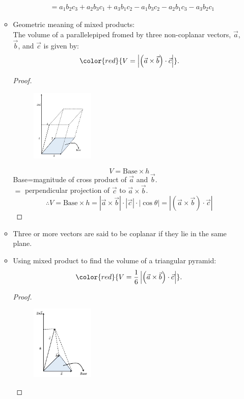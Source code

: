 \documentclass[12pt, a4paper]{article}
\newtheorem{proof}{Proof}[subsection]
\begin{document}
\begin{enumerate}
\begin{itemize}
$$\begin{aligned}
      &=a_1b_2c_3+a_2b_3c_1+a_3b_1c_2-a_1b_3c_2-a_2b_1c_3-a_3b_2c_1
    \end{aligned}$$
    \item Geometric meaning of mixed products: \\
    The volume of a parallelepiped fromed by three non-coplanar vectors, $\vec{a}$, $\vec{b}$, and $\vec{c}$ is given by: 
    $${\color{red}{V=\left|\left(\vec{a}\times\vec{b}\right)\cdot\vec{c}\right|}}.$$
    \begin{proof}
      \begin{figure}[H]
        \centering
        \includegraphics[width=0.3\textwidth]{Fig.3.10.jpg}
      \end{figure}
      $$V=\text{Base}\times h$$
      Base=magnitude of cross product of $\vec{a}$ and $\vec{b}$.\\
      $=$ perpendicular projection of $\vec{c}$ to $\vec{a}\times\vec{b}$.\\
      $$\therefore V=\text{Base}\times h=\left|\vec{a}\times\vec{b}\right|\cdot\left|\vec{c}\right|\cdot\left|\cos\theta\right|=\left|\left(\vec{a}\times\vec{b}\right)\cdot\vec{c}\right|$$
    \end{proof}
    \item Three or more vectors are said to be coplanar if they lie in the same plane.
    \item Using mixed product to find the volume of a triangular pyramid: 
    $${\color{red}{V=\frac{1}{6}\left|\left(\vec{a}\times\vec{b}\right)\cdot\vec{c}\right|}}.$$
    \begin{proof}
      \begin{figure}[H]
        \centering
        \includegraphics[width=0.3\textwidth]{Fig.3.11.jpg}

\end{figure}
\end{proof}
\end{itemize}
\end{enumerate}
\end{document}
